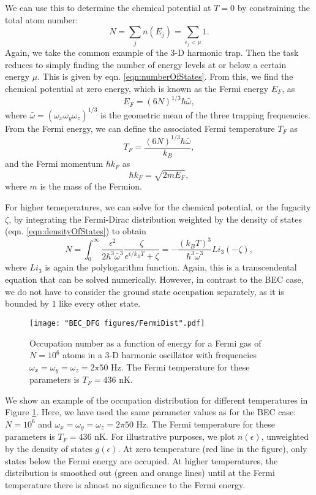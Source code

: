 We can use this to determine the chemical potential at $T=0$ by constraining the total atom number:
\begin{equation}
N=\sum_j n(E_j) = \sum_{\epsilon_j<\mu} 1.
\end{equation}
Again, we take the common example of the 3-D harmonic trap. Then the task reduces to simply finding the number of energy levels at or below a certain energy $\mu$. This is given by eqn. \ref{eqn:numberOfStates}. From this, we find the chemical potential at zero energy, which is known as the Fermi energy $E_F$, as
\begin{equation}
E_F = (6 N)^{1/3}\hbar\bar{\omega},
\end{equation}
where $\bar{\omega}=(\omega_x\omega_y\omega_z)^{1/3}$ is the geometric mean of the three trapping frequencies. From the Fermi energy, we can define the associated Fermi temperature $T_F$ as
\begin{equation}
T_F = \frac{(6 N)^{1/3}\hbar\bar{\omega}}{k_B},
\end{equation}
and the Fermi momentum $\hbar k_F$ as
\begin{equation}
\hbar k_F = \sqrt{2 m E_F},
\end{equation}
where $m$ is the mass of the Fermion. 

For higher temeperatures, we can solve for the chemical potential, or the fugacity $\zeta$, by integrating the Fermi-Dirac distribution weighted by the density of states (eqn. \ref{eqn:densityOfStates}) to obtain
\begin{equation}
N = \int_0^{\infty} \frac{\epsilon^2}{2\hbar^3 \bar{\omega}^3}\frac{\zeta}{e^{\epsilon/k_B T}+\zeta} = -\frac{(k_BT)^3}{\hbar^3 \bar{\omega}^3}Li_3(-\zeta),
\end{equation}
where $Li_3$ is again the polylogarithm function. Again, this is a transcendental equation that can be solved numerically. However, in contrast to the BEC case, we do not have to consider the ground state occupation separately, as it is bounded by $1$ like every other state. 

\begin{figure}
	\texttt{[image: "BEC\_DFG figures/FermiDist".pdf]}
\caption{Occupation number as a function of energy for a Fermi gas of $N=10^6$ atoms in a 3-D harmonic oscillator with frequencies $\omega_x=\omega_y=\omega_z=2\pi 50$ Hz. The Fermi temperature for these parameters is $T_F=436$ nK.}
\label{fig:FermiDist}
\end{figure}

We show an example of the occupation distribution for different temperatures in Figure \ref{fig:FermiDist}. Here, we have used the same parameter values as for the BEC case: $N=10^6$ and $\omega_x=\omega_y=\omega_z=2\pi 50$ Hz. The Fermi temperature for these parameters is $T_F=436$ nK.  For illustrative purposes, we plot $n(\epsilon)$, unweighted by the density of states $g(\epsilon)$. At zero temperature (red line in the figure), only states below the Fermi energy are occupied. At higher temperatures, the distribution is smoothed out (green and orange lines) until at the Fermi temperature there is almost no significance to the Fermi energy.

